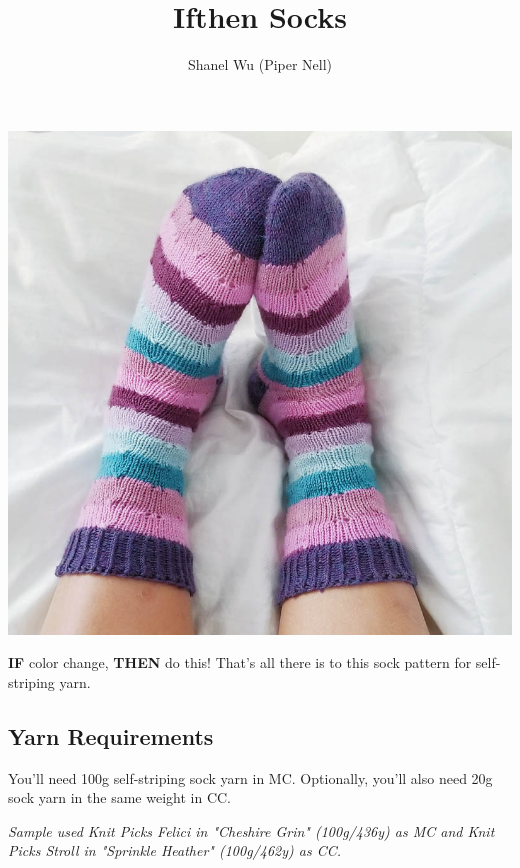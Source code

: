\documentclass[12pt]{article}
\title{Ifthen Socks} %
\author{Shanel Wu (Piper Nell)}
\begin{document}
\begin{titlingpage}


{\selectfont
\HUGE\textbf{\thetitle}
\hspace{4em} %
\normalsize\theauthor
}


\begin{multicols}{2}
\includegraphics[width=0.9\linewidth]{bedtwo-small.jpg}
\vspace{1em}

\textbf{IF} color change, \textbf{THEN} do this! That's all there is to this sock pattern for self-striping yarn.

\subsection*{Yarn Requirements}

You'll need 100g self-striping sock yarn in MC. Optionally, you'll also need 20g sock yarn in the same weight in CC.

\vspace{1em}

\emph{Sample used Knit Picks Felici in "Cheshire Grin" (100g/436y) as MC and Knit Picks Stroll in "Sprinkle Heather" (100g/462y) as CC.}


\end{multicols}
\end{titlingpage}
\end{document}
